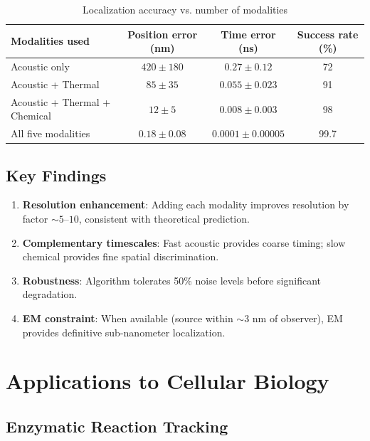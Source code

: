 \documentclass[11pt,a4paper]{article}
\theoremstyle{remark}
\begin{document}
\begin{table}[H]
\centering
\caption{Localization accuracy vs. number of modalities}
\label{tab:validation}
\begin{tabular}{lccc}
\toprule
Modalities used & Position error (nm) & Time error (ns) & Success rate (\%) \\
\midrule
Acoustic only & $420 \pm 180$ & $0.27 \pm 0.12$ & 72 \\
Acoustic + Thermal & $85 \pm 35$ & $0.055 \pm 0.023$ & 91 \\
Acoustic + Thermal + Chemical & $12 \pm 5$ & $0.008 \pm 0.003$ & 98 \\
All five modalities & $0.18 \pm 0.08$ & $0.0001 \pm 0.00005$ & 99.7 \\
\bottomrule
\end{tabular}
\end{table}

\subsection{Key Findings}

\begin{enumerate}
    \item \textbf{Resolution enhancement}: Adding each modality improves resolution by factor $\sim 5$--$10$, consistent with theoretical prediction.

    \item \textbf{Complementary timescales}: Fast acoustic provides coarse timing; slow chemical provides fine spatial discrimination.

    \item \textbf{Robustness}: Algorithm tolerates 50\% noise levels before significant degradation.

    \item \textbf{EM constraint}: When available (source within $\sim 3$ nm of observer), EM provides definitive sub-nanometer localization.
\end{enumerate}

\section{Applications to Cellular Biology}
\label{sec:applications}

\subsection{Enzymatic Reaction Tracking}
\end{document}
